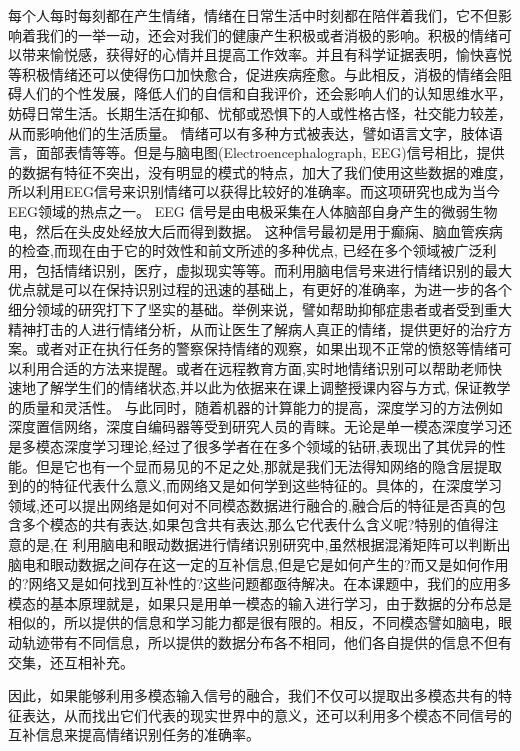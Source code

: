 	每个人每时每刻都在产生情绪，情绪在日常生活中时刻都在陪伴着我们，它不但影响着我们的一举一动，还会对我们的健康产生积极或者消极的影响。积极的情绪可以带来愉悦感，获得好的心情并且提高工作效率。并且有科学证据表明，愉快喜悦等积极情绪还可以使得伤口加快愈合，促进疾病痊愈。与此相反，消极的情绪会阻碍人们的个性发展，降低人们的自信和自我评价，还会影响人们的认知思维水平，妨碍日常生活。长期生活在抑郁、忧郁或恐惧下的人或性格古怪，社交能力较差，从而影响他们的生活质量。
	情绪可以有多种方式被表达，譬如语言文字，肢体语言，面部表情等等。但是与脑电图(Electroencephalograph, EEG)信号相比，提供的数据有特征不突出，没有明显的模式的特点，加大了我们使用这些数据的难度，所以利用EEG信号来识别情绪可以获得比较好的准确率。而这项研究也成为当今EEG领域的热点之一。
	EEG 信号是由电极采集在人体脑部自身产生的微弱生物电，然后在头皮处经放大后而得到数据。 这种信号最初是用于癫痫、脑血管疾病的检查,而现在由于它的时效性和前文所述的多种优点, 已经在多个领域被广泛利用，包括情绪识别，医疗，虚拟现实等等。而利用脑电信号来进行情绪识别的最大优点就是可以在保持识别过程的迅速的基础上，有更好的准确率，为进一步的各个细分领域的研究打下了坚实的基础。举例来说，譬如帮助抑郁症患者或者受到重大精神打击的人进行情绪分析，从而让医生了解病人真正的情绪，提供更好的治疗方案。或者对正在执行任务的警察保持情绪的观察，如果出现不正常的愤怒等情绪可以利用合适的方法来提醒。或者在远程教育方面,实时地情绪识别可以帮助老师快速地了解学生们的情绪状态,并以此为依据来在课上调整授课内容与方式, 保证教学的质量和灵活性。
	与此同时，随着机器的计算能力的提高，深度学习的方法例如深度置信网络，深度自编码器等受到研究人员的青睐。无论是单一模态深度学习还是多模态深度学习理论,经过了很多学者在在多个领域的钻研,表现出了其优异的性能。但是它也有一个显而易见的不足之处,那就是我们无法得知网络的隐含层提取到的的特征代表什么意义,而网络又是如何学到这些特征的。具体的，在深度学习领域,还可以提出网络是如何对不同模态数据进行融合的,融合后的特征是否真的包含多个模态的共有表达,如果包含共有表达,那么它代表什么含义呢?特别的值得注意的是,在 利用脑电和眼动数据进行情绪识别研究中,虽然根据混淆矩阵可以判断出脑电和眼动数据之间存在这一定的互补信息,但是它是如何产生的?而又是如何作用的?网络又是如何找到互补性的?这些问题都亟待解决。在本课题中，我们的应用多模态的基本原理就是，如果只是用单一模态的输入进行学习，由于数据的分布总是相似的，所以提供的信息和学习能力都是很有限的。相反，不同模态譬如脑电，眼动轨迹带有不同信息，所以提供的数据分布各不相同，他们各自提供的信息不但有交集，还互相补充。
	
	因此，如果能够利用多模态输入信号的融合，我们不仅可以提取出多模态共有的特征表达，从而找出它们代表的现实世界中的意义，还可以利用多个模态不同信号的互补信息来提高情绪识别任务的准确率。
	
